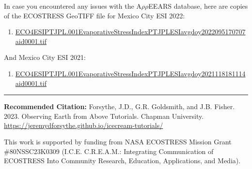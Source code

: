 \documentclass[oneside,a4paper,11pt,explicit]{book}
\begin{document}
\begin{tcolorbox}[colback=yellow!5!white,title=\textbf{Datafiles}]
	\large
	In case you encountered any issues with the A$\rho\rho$EEARS database, here are copies of the ECOSTRESS GeoTIFF file for Mexico City ESI 2022:
	\begin{enumerate}
		\item \href{https://jeremydforsythe.github.io/icecream-tutorials/Tutorial8_ESI/ECO4ESIPTJPL.001_Evaporative_Stress_Index_PT_JPL_ESIavg_doy2022095170707_aid0001.tif}{\small ECO4ESIPTJPL.001\textunderscore Evaporative\textunderscore Stress\textunderscore Index\textunderscore PT\textunderscore JPL\textunderscore ESIavg\textunderscore doy2022095170707\textunderscore aid0001.tif}
	\end{enumerate}
	And Mexico City ESI 2021:
	\begin{enumerate}
		\item \href{https://jeremydforsythe.github.io/icecream-tutorials/Tutorial8_ESI/ECO4ESIPTJPL.001_Evaporative_Stress_Index_PT_JPL_ESIavg_doy2021118181114_aid0001.tif}{\small ECO4ESIPTJPL.001\textunderscore Evaporative\textunderscore Stress\textunderscore Index\textunderscore PT\textunderscore JPL\textunderscore ESIavg\textunderscore doy2021118181114\textunderscore aid0001.tif}
	\end{enumerate}
\end{tcolorbox}


\hrule

\vspace{1em}

\small \textbf{Recommended Citation:} Forsythe, J.D., G.R. Goldsmith, and J.B. Fisher. 2023. Observing Earth from Above Tutorials. Chapman University. \url{https://jeremydforsythe.github.io/icecream-tutorials/}

\vspace{1em}

This work is supported by funding from NASA ECOSTRESS Mission Grant \#80NSSC23K0309 (I.C.E. C.R.E.A.M.: Integrating Communication of ECOSTRESS Into Community Research, Education, Applications, and Media).
\end{document}
